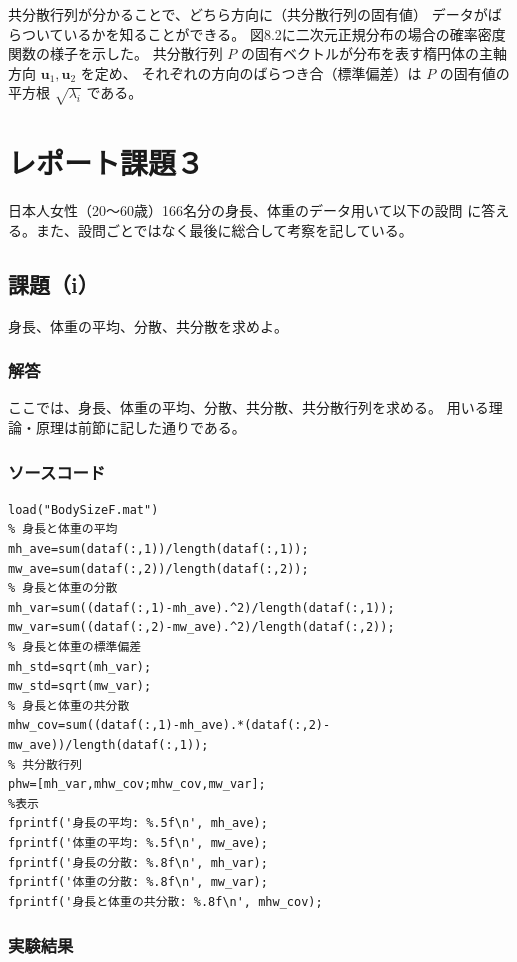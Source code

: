 \documentclass[10pt,a4paper,titlepage]{jreport} %
\begin{document}
共分散行列が分かることで、どちら方向に（共分散行列の固有値）
データがばらついているかを知ることができる。
図8.2に二次元正規分布の場合の確率密度関数の様子を示した。
共分散行列 $P$ の固有ベクトルが分布を表す楕円体の主軸方向
$\mathbf{u}_1, \mathbf{u}_2$ を定め、
それぞれの方向のばらつき合（標準偏差）は
$P$ の固有値の平方根 $\sqrt{\lambda_i}$ である。

\section{レポート課題３}

日本人女性（20～60歳）166名分の身長、体重のデータ用いて以下の設問
に答える。また、設問ごとではなく最後に総合して考察を記している。
\subsection{課題（i）}

身長、体重の平均、分散、共分散を求めよ。

\subsubsection{解答}

ここでは、身長、体重の平均、分散、共分散、共分散行列を求める。
用いる理論・原理は前節に記した通りである。

\subsubsection{ソースコード}

\begin{lstlisting}[caption=身長、体重の平均、分散、共分散、共分散行列]
load("BodySizeF.mat")
% 身長と体重の平均
mh_ave=sum(dataf(:,1))/length(dataf(:,1));
mw_ave=sum(dataf(:,2))/length(dataf(:,2));
% 身長と体重の分散
mh_var=sum((dataf(:,1)-mh_ave).^2)/length(dataf(:,1));
mw_var=sum((dataf(:,2)-mw_ave).^2)/length(dataf(:,2));
% 身長と体重の標準偏差
mh_std=sqrt(mh_var);
mw_std=sqrt(mw_var);
% 身長と体重の共分散
mhw_cov=sum((dataf(:,1)-mh_ave).*(dataf(:,2)-mw_ave))/length(dataf(:,1));
% 共分散行列
phw=[mh_var,mhw_cov;mhw_cov,mw_var];
%表示
fprintf('身長の平均: %.5f\n', mh_ave);
fprintf('体重の平均: %.5f\n', mw_ave);
fprintf('身長の分散: %.8f\n', mh_var);
fprintf('体重の分散: %.8f\n', mw_var);
fprintf('身長と体重の共分散: %.8f\n', mhw_cov);
\end{lstlisting}

\subsubsection{実験結果}
\end{document}
